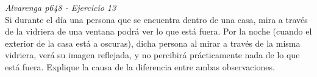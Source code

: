 \textit{Alvarenga p648 - Ejercicio 13}\\Si durante el día una persona que se encuentra dentro de una casa, mira a través de la vidriera de una ventana podrá ver lo que está fuera. Por la noche (cuando el exterior de la casa está a oscuras), dicha persona al mirar a través de la misma vidriera, verá su imagen reflejada, y no percibirá prácticamente nada de lo que está fuera. Explique la causa de la diferencia entre ambas observaciones.